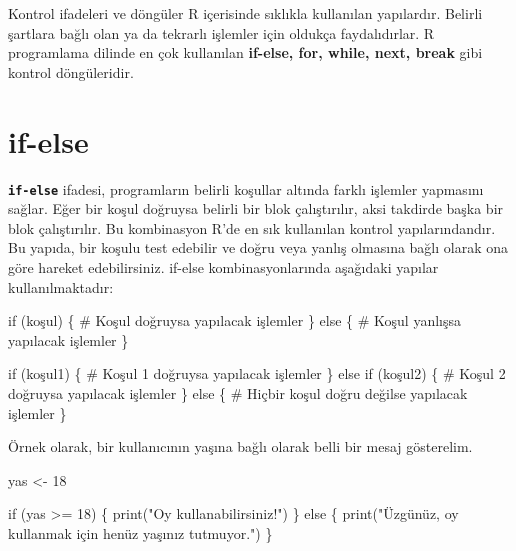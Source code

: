 \documentclass[
  letterpaper,
  DIV=11,
  numbers=noendperiod]{scrreprt}
\newenvironment{Shaded}{\begin{snugshade}}{\end{snugshade}}
\newcommand{\CommentTok}[1]{\textcolor[rgb]{0.37,0.37,0.37}{#1}}
\newcommand{\ControlFlowTok}[1]{\textcolor[rgb]{0.00,0.23,0.31}{#1}}
\newcommand{\DecValTok}[1]{\textcolor[rgb]{0.68,0.00,0.00}{#1}}
\newcommand{\FunctionTok}[1]{\textcolor[rgb]{0.28,0.35,0.67}{#1}}
\newcommand{\NormalTok}[1]{\textcolor[rgb]{0.00,0.23,0.31}{#1}}
\newcommand{\OtherTok}[1]{\textcolor[rgb]{0.00,0.23,0.31}{#1}}
\newcommand{\SpecialCharTok}[1]{\textcolor[rgb]{0.37,0.37,0.37}{#1}}
\newcommand{\StringTok}[1]{\textcolor[rgb]{0.13,0.47,0.30}{#1}}
\begin{document}
Kontrol ifadeleri ve döngüler R içerisinde sıklıkla kullanılan
yapılardır. Belirli şartlara bağlı olan ya da tekrarlı işlemler için
oldukça faydalıdırlar. R programlama dilinde en çok kullanılan
\textbf{if-else, for, while, next, break} gibi kontrol döngüleridir.

\section{if-else}\label{if-else}

\textbf{\texttt{if-else}} ifadesi, programların belirli koşullar altında
farklı işlemler yapmasını sağlar. Eğer bir koşul doğruysa belirli bir
blok çalıştırılır, aksi takdirde başka bir blok çalıştırılır. Bu
kombinasyon R'de en sık kullanılan kontrol yapılarındandır. Bu yapıda,
bir koşulu test edebilir ve doğru veya yanlış olmasına bağlı olarak ona
göre hareket edebilirsiniz. if-else kombinasyonlarında aşağıdaki yapılar
kullanılmaktadır:

\begin{Shaded}
\begin{Highlighting}[]
\ControlFlowTok{if}\NormalTok{ (koşul) \{}
  \CommentTok{\# Koşul doğruysa yapılacak işlemler}
\NormalTok{\} }\ControlFlowTok{else}\NormalTok{ \{}
  \CommentTok{\# Koşul yanlışsa yapılacak işlemler}
\NormalTok{\}}
\end{Highlighting}
\end{Shaded}

\begin{Shaded}
\begin{Highlighting}[]
\ControlFlowTok{if}\NormalTok{ (koşul1) \{}
  \CommentTok{\# Koşul 1 doğruysa yapılacak işlemler}
\NormalTok{\} }\ControlFlowTok{else} \ControlFlowTok{if}\NormalTok{ (koşul2) \{}
  \CommentTok{\# Koşul 2 doğruysa yapılacak işlemler}
\NormalTok{\} }\ControlFlowTok{else}\NormalTok{ \{}
  \CommentTok{\# Hiçbir koşul doğru değilse yapılacak işlemler}
\NormalTok{\}}
\end{Highlighting}
\end{Shaded}

Örnek olarak, bir kullanıcının yaşına bağlı olarak belli bir mesaj
gösterelim.

\begin{Shaded}
\begin{Highlighting}[]
\NormalTok{yas }\OtherTok{\textless{}{-}} \DecValTok{18}

\ControlFlowTok{if}\NormalTok{ (yas }\SpecialCharTok{\textgreater{}=} \DecValTok{18}\NormalTok{) \{}
  \FunctionTok{print}\NormalTok{(}\StringTok{"Oy kullanabilirsiniz!"}\NormalTok{)}
\NormalTok{\} }\ControlFlowTok{else}\NormalTok{ \{}
  \FunctionTok{print}\NormalTok{(}\StringTok{"Üzgünüz, oy kullanmak için henüz yaşınız tutmuyor."}\NormalTok{)}
\NormalTok{\}}
\end{Highlighting}
\end{Shaded}
\end{document}
